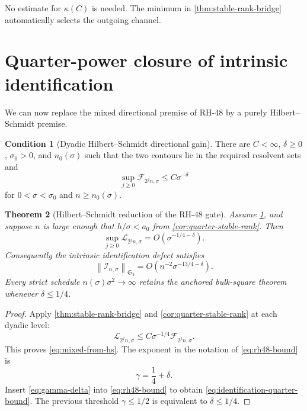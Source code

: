 \documentclass[11pt]{article}
\newtheorem{theorem}{Theorem}[section]
\theoremstyle{definition}
\newtheorem{condition}[theorem]{Condition}
\theoremstyle{remark}
\newcommand{\cF}{\mathcal F}
\newcommand{\cL}{\mathcal L}
\newcommand{\cI}{\mathcal I}
\newcommand{\HS}{\mathfrak S_2}
\newcommand{\norm}[1]{\left\lVert #1\right\rVert}
\begin{document}
No estimate for \(\kappa(C)\) is needed.  The minimum in
\cref{thm:stable-rank-bridge} automatically selects the outgoing channel.

\section{Quarter-power closure of intrinsic identification}
\label{sec:closure}

We can now replace the mixed directional premise of RH-48 by a purely
Hilbert--Schmidt premise.

\begin{condition}[Dyadic Hilbert--Schmidt directional gain]
\label{cond:hs-gain}
There are \(C<\infty\), \(\delta\ge0\), \(\sigma_0>0\), and
\(n_0(\sigma)\) such that the two contours lie in the required resolvent sets
and
\begin{equation}
 \sup_{j\ge0}\cF_{2^jn,\sigma}
 \le C\sigma^{-\delta}
 \label{eq:hs-gain-condition}
\end{equation}
for \(0<\sigma<\sigma_0\) and \(n\ge n_0(\sigma)\).
\end{condition}

\begin{theorem}[Hilbert--Schmidt reduction of the RH-48 gate]
\label{thm:hs-closure}
Assume \cref{cond:hs-gain}, and suppose \(n\) is large enough that
\(h/\sigma<a_0\) from \cref{cor:quarter-stable-rank}.  Then
\begin{equation}
 \sup_{j\ge0}\cL_{2^jn,\sigma}
 =O(\sigma^{-1/4-\delta}).
 \label{eq:mixed-from-hs}
\end{equation}
Consequently the intrinsic identification defect satisfies
\begin{equation}
 \boxed{
 \norm{\cI_{n,\sigma}}_{\HS}
 =O(n^{-2}\sigma^{-13/4-\delta}).}
 \label{eq:identification-quarter-bound}
\end{equation}
Every strict schedule \(n(\sigma)\sigma^2\to\infty\) retains the anchored
bulk-square theorem whenever \(\delta\le1/4\).
\end{theorem}

\begin{proof}
Apply \cref{thm:stable-rank-bridge} and
\cref{cor:quarter-stable-rank} at each dyadic level:
\[
 \cL_{2^jn,\sigma}
 \le C\sigma^{-1/4}\cF_{2^jn,\sigma}.
\]
This proves \eqref{eq:mixed-from-hs}.  The exponent in the notation of
\eqref{eq:rh48-bound} is
\begin{equation}
 \gamma=\frac14+\delta.
 \label{eq:gamma-delta}
\end{equation}
Insert \eqref{eq:gamma-delta} into \eqref{eq:rh48-bound} to obtain
\eqref{eq:identification-quarter-bound}.  The previous threshold
\(\gamma\le1/2\) is equivalent to \(\delta\le1/4\).
\end{proof}
\end{document}
